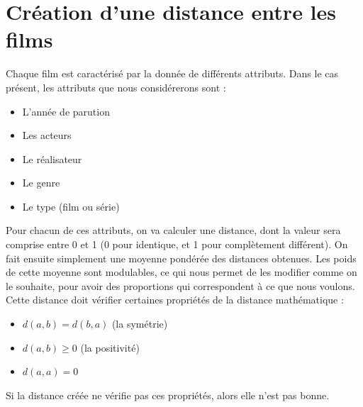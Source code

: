 \documentclass{report}
\begin{document}


\section{Création d'une distance entre les films}
Chaque film est caractérisé par la donnée de différents attributs. Dans le cas présent, les attributs que nous considérerons sont :
\begin{itemize}
    \item L'année de parution
    \item Les acteurs
    \item Le réalisateur
    \item Le genre
    \item Le type (film ou série)
\end{itemize}
Pour chacun de ces attributs, on va calculer une distance, dont la valeur sera comprise entre 0 et 1 (0 pour identique, et 1 pour complètement différent). On fait ensuite simplement une moyenne pondérée des distances obtenues. Les poids de cette moyenne sont modulables, ce qui nous permet de les modifier comme on le souhaite, pour avoir des proportions qui correspondent à ce que nous voulons.\\
Cette distance doit vérifier certaines propriétés de la distance mathématique :
\begin{itemize}
    \item \(d(a,b)=d(b,a)\) (la symétrie)
    \item \(d(a,b) \geq 0\) (la positivité)
    \item \(d(a,a)=0\)
\end{itemize}
Si la distance créée ne vérifie pas ces propriétés, alors elle n'est pas bonne.
\end{document}
